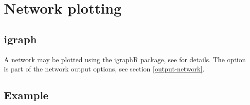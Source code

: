 \documentclass[a4paper,12pt]{article}
\begin{document}



\section{Network plotting}
\label{plot-network}
\subsection{igraph}
\label{igraph}

A network may be plotted using the igraphR package, see \citet{igraph} for details. The option is part of the network output options, see  section \ref{output-network}. 


\subsection{Example}
\label{igraph-example}
\end{document}
